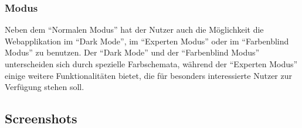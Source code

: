 \subsubsection{Modus}
Neben dem \enquote{Normalen Modus} hat der Nutzer auch die Möglichkeit die Webapplikation im \enquote{Dark Mode}, im \enquote{Experten Modus} oder im \enquote{Farbenblind Modus} zu benutzen.
Der \enquote{Dark Mode} und der \enquote{Farbenblind Modus} unterscheiden sich durch spezielle Farbschemata, während der \enquote{Experten Modus} einige weitere Funktionalitäten bietet, die für besonders interessierte Nutzer zur Verfügung stehen soll. 

\subsection{Screenshots}
\label{Screenshots}

